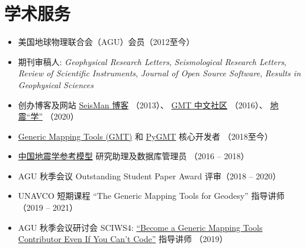 \section*{学术服务}

\begin{itemize}
\item 美国地球物理联合会（AGU）会员（2012至今）
\item 期刊审稿人: \textit{Geophysical Research Letters},
				  \textit{Seismological Research Letters},
				  \textit{Review of Scientific Instruments},
				  \textit{Journal of Open Source Software},
				  \textit{Results in Geophysical Sciences}
\item 创办博客及网站
	  \href{https://blog.seisman.info}{SeisMan 博客} （2013）、
	  \href{http://gmt-china.org/}{GMT 中文社区} （2016）、
	  \href{https://seismo-learn.org/}{地震``学''} （2020）
\item \href{https://github.com/GenericMappingTools/gmt}{Generic Mapping Tools (GMT)} 和 \href{https://github.com/GenericMappingTools/pygmt}{PyGMT} 核心开发者 （2018至今）
\item \href{http://chinageorefmodel.org/}{中国地震学参考模型} 研究助理及数据库管理员 （2016 -- 2018）
\item AGU 秋季会议 Outstanding Student Paper Award 评审（2018 -- 2020）
\item UNAVCO 短期课程 ``The Generic Mapping Tools for Geodesy'' 指导讲师（2019 -- 2021）
\item AGU 秋季会议研讨会 SCIWS4: \href{https://www.agu.org/Events/SCIWS4-Generic-Mapping-Tools}{``Become a Generic Mapping Tools Contributor Even If You Can't Code''} 指导讲师 （2019）
\end{itemize}

